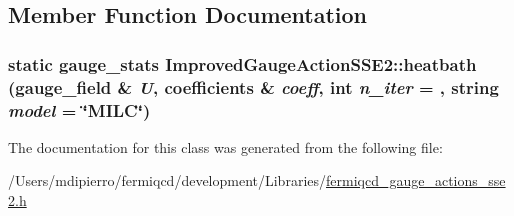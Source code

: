 \subsection{Member Function Documentation}
\hypertarget{class_improved_gauge_action_s_s_e2_acbc479ba8ed2d4e8fbb42f703b59570c}{
\subsubsection[{heatbath}]{\setlength{\rightskip}{0pt plus 5cm}static {\bf gauge\_\-stats} ImprovedGaugeActionSSE2::heatbath ({\bf gauge\_\-field} \& {\em U}, \/  {\bf coefficients} \& {\em coeff}, \/  int {\em n\_\-iter} = {}, \/  string {\em model} = {\ttfamily \char`\"{}MILC\char`\"{}})}}
\label{class_improved_gauge_action_s_s_e2_acbc479ba8ed2d4e8fbb42f703b59570c}


The documentation for this class was generated from the following file:\begin{DoxyCompactItemize}
\item 
/Users/mdipierro/fermiqcd/development/Libraries/\hyperlink{fermiqcd__gauge__actions__sse2_8h}{fermiqcd\_\-gauge\_\-actions\_\-sse2.h}\end{DoxyCompactItemize}

